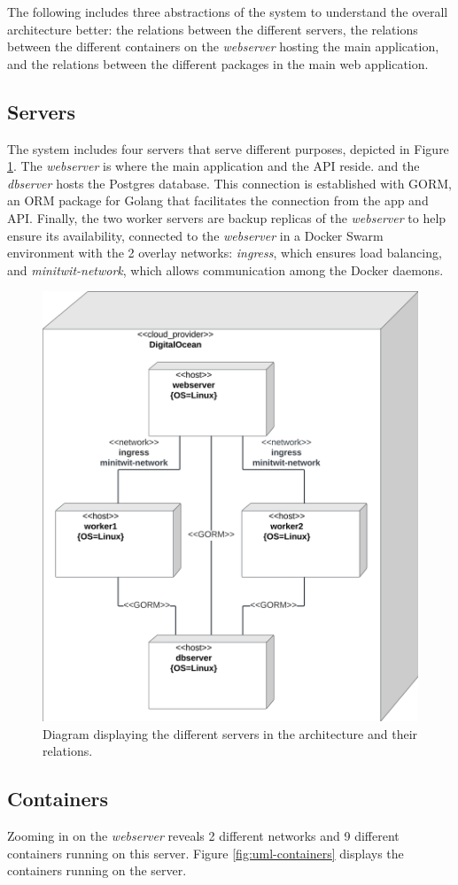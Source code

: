 \documentclass[12pt, a4paper, oneside]{book}
\begin{document}
The following includes three abstractions of the system to understand the overall architecture better: the relations between the different servers, the relations between the different containers on the \textit{webserver} hosting the main application, and the relations between the different packages in the main web application.

\subsection{Servers}
The system includes four servers that serve different purposes, depicted in Figure \ref{fig:uml-servers}.
The \textit{webserver} is where the main application and the API reside. and the \textit{dbserver} hosts the Postgres database.
This connection is established with GORM, an ORM package for Golang that facilitates the connection from the app and API.
Finally, the two worker servers are backup replicas of the \textit{webserver} to help ensure its availability, connected to the \textit{webserver} in a Docker Swarm environment with the 2 overlay networks: \textit{ingress}, which ensures load balancing, and \textit{minitwit-network}, which allows communication among the Docker daemons.

\begin{figure}[H]
    \centering
    \includegraphics[width=0.6\linewidth]{images/uml-component-servers.png}
    \caption{Diagram displaying the different servers in the architecture and their relations.}
    \label{fig:uml-servers}
\end{figure}

\subsection{Containers}
Zooming in on the \textit{webserver} reveals 2 different networks and 9 different containers running on this server.
Figure \ref{fig:uml-containers} displays the containers running on the server.
\end{document}
